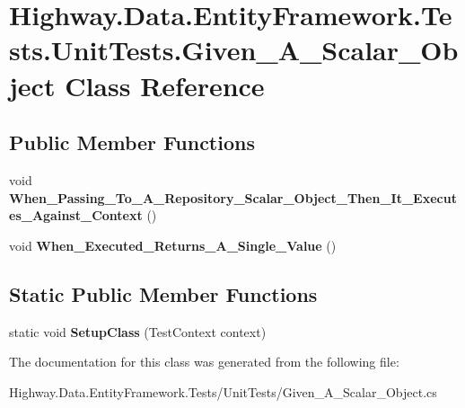 \hypertarget{class_highway_1_1_data_1_1_entity_framework_1_1_tests_1_1_unit_tests_1_1_given___a___scalar___object}{\section{Highway.\-Data.\-Entity\-Framework.\-Tests.\-Unit\-Tests.\-Given\-\_\-\-A\-\_\-\-Scalar\-\_\-\-Object Class Reference}
\label{class_highway_1_1_data_1_1_entity_framework_1_1_tests_1_1_unit_tests_1_1_given___a___scalar___object}
}
\subsection*{Public Member Functions}
\begin{DoxyCompactItemize}
\item 
\hypertarget{class_highway_1_1_data_1_1_entity_framework_1_1_tests_1_1_unit_tests_1_1_given___a___scalar___object_af6a2262da53da80183a784690a16137b}{void {\bfseries When\-\_\-\-Passing\-\_\-\-To\-\_\-\-A\-\_\-\-Repository\-\_\-\-Scalar\-\_\-\-Object\-\_\-\-Then\-\_\-\-It\-\_\-\-Executes\-\_\-\-Against\-\_\-\-Context} ()}\label{class_highway_1_1_data_1_1_entity_framework_1_1_tests_1_1_unit_tests_1_1_given___a___scalar___object_af6a2262da53da80183a784690a16137b}

\item 
\hypertarget{class_highway_1_1_data_1_1_entity_framework_1_1_tests_1_1_unit_tests_1_1_given___a___scalar___object_a01f4a097a143bdce45379bdd5e9f0953}{void {\bfseries When\-\_\-\-Executed\-\_\-\-Returns\-\_\-\-A\-\_\-\-Single\-\_\-\-Value} ()}\label{class_highway_1_1_data_1_1_entity_framework_1_1_tests_1_1_unit_tests_1_1_given___a___scalar___object_a01f4a097a143bdce45379bdd5e9f0953}

\end{DoxyCompactItemize}
\subsection*{Static Public Member Functions}
\begin{DoxyCompactItemize}
\item 
\hypertarget{class_highway_1_1_data_1_1_entity_framework_1_1_tests_1_1_unit_tests_1_1_given___a___scalar___object_a816004ac68c5a424f62138953ac6e70c}{static void {\bfseries Setup\-Class} (Test\-Context context)}\label{class_highway_1_1_data_1_1_entity_framework_1_1_tests_1_1_unit_tests_1_1_given___a___scalar___object_a816004ac68c5a424f62138953ac6e70c}

\end{DoxyCompactItemize}


The documentation for this class was generated from the following file\-:\begin{DoxyCompactItemize}
\item 
Highway.\-Data.\-Entity\-Framework.\-Tests/\-Unit\-Tests/Given\-\_\-\-A\-\_\-\-Scalar\-\_\-\-Object.\-cs\end{DoxyCompactItemize}
